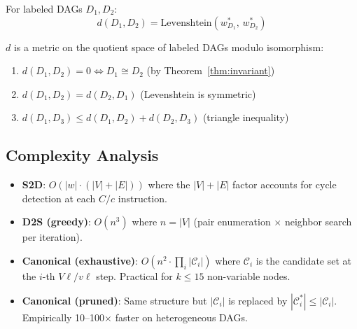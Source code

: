 \begin{definition}
For labeled DAGs $D_1, D_2$:
\[
  d(D_1, D_2) = \text{Levenshtein}(w^*_{D_1},\, w^*_{D_2})
\]
\end{definition}

\begin{proposition}
$d$ is a metric on the quotient space of labeled DAGs modulo isomorphism:
\begin{enumerate}[nosep]
  \item $d(D_1, D_2) = 0 \iff D_1 \cong D_2$ \quad (by Theorem~\ref{thm:invariant})
  \item $d(D_1, D_2) = d(D_2, D_1)$ \quad (Levenshtein is symmetric)
  \item $d(D_1, D_3) \leq d(D_1, D_2) + d(D_2, D_3)$ \quad (triangle inequality)
\end{enumerate}
\end{proposition}

\subsection{Complexity Analysis}

\begin{itemize}[nosep]
  \item \textbf{S2D}: $O(|w| \cdot (|V| + |E|))$ where the $|V|+|E|$ factor
    accounts for cycle detection at each $C/c$ instruction.
  \item \textbf{D2S (greedy)}: $O(n^3)$ where $n = |V|$ (pair enumeration
    $\times$ neighbor search per iteration).
  \item \textbf{Canonical (exhaustive)}: $O\!\left(n^2 \cdot \prod_{i} |\mathcal{C}_i|\right)$
    where $\mathcal{C}_i$ is the candidate set at the $i$-th $V\ell/v\ell$ step.
    Practical for $k \leq 15$ non-variable nodes.
  \item \textbf{Canonical (pruned)}: Same structure but $|\mathcal{C}_i|$ is
    replaced by $|\mathcal{C}^*_i| \leq |\mathcal{C}_i|$. Empirically
    10--100$\times$ faster on heterogeneous DAGs.
\end{itemize}
